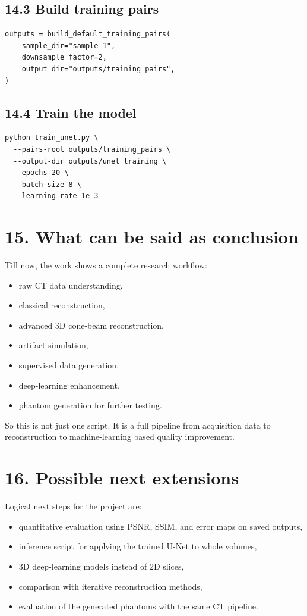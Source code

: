 \documentclass[12pt,a4paper]{article}
\begin{document}
\subsection*{14.3 Build training pairs}
\begin{lstlisting}[style=py]
outputs = build_default_training_pairs(
    sample_dir="sample 1",
    downsample_factor=2,
    output_dir="outputs/training_pairs",
)
\end{lstlisting}

\subsection*{14.4 Train the model}
\begin{lstlisting}[style=py]
python train_unet.py \
  --pairs-root outputs/training_pairs \
  --output-dir outputs/unet_training \
  --epochs 20 \
  --batch-size 8 \
  --learning-rate 1e-3
\end{lstlisting}

\section*{15. What can be said as conclusion}
Till now, the work shows a complete research workflow:
\begin{itemize}[leftmargin=*]
\item raw CT data understanding,
\item classical reconstruction,
\item advanced 3D cone-beam reconstruction,
\item artifact simulation,
\item supervised data generation,
\item deep-learning enhancement,
\item phantom generation for further testing.
\end{itemize}

So this is not just one script. It is a full pipeline from acquisition data to reconstruction to machine-learning based quality improvement.

\section*{16. Possible next extensions}
Logical next steps for the project are:
\begin{itemize}[leftmargin=*]
\item quantitative evaluation using PSNR, SSIM, and error maps on saved outputs,
\item inference script for applying the trained U-Net to whole volumes,
\item 3D deep-learning models instead of 2D slices,
\item comparison with iterative reconstruction methods,
\item evaluation of the generated phantoms with the same CT pipeline.
\end{itemize}
\end{document}
